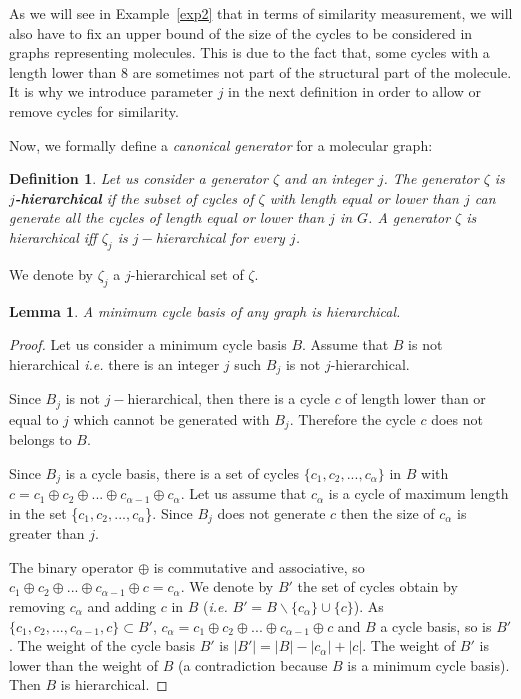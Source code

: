 \documentclass[10pt,letterpaper]{article}
\newtheorem{definition}{Definition}
\newtheorem{lemme}{Lemma}
\begin{document}
As we will see in Example~\ref{exp2} that in terms of similarity measurement, we will also have to fix an upper bound of the size of the cycles to be considered in graphs representing molecules. This is due to the fact that, some cycles with a length lower than $8$ are sometimes not part of the structural part of the molecule. It is why we introduce parameter $j$ in the next definition in order to allow or remove cycles for similarity.

Now, we formally define a \textit{canonical generator} for a molecular graph: 

\begin{definition}
Let us consider a generator $\zeta$ and an integer $j$. The generator $\zeta$ is {\bf $j$-hierarchical} if the subset of cycles of $\zeta$ with length equal or lower than $j$ can generate all the cycles of length equal or lower than $j$ in $G$. A generator $\zeta$ is hierarchical iff $\zeta_j$ is $j-$hierarchical for every $j$. 
\end{definition}


We denote by $\zeta_j$ a $j$-hierarchical set of $\zeta$.

\begin{lemme}
A minimum cycle basis of any graph is hierarchical.
\end{lemme}

\begin{proof}
\normalfont
Let us consider a minimum cycle basis $B$. Assume that $B$ is not hierarchical \textit{i.e.} there is an integer $j$ such $B_j$ is not $j$-hierarchical. 

Since $B_j$ is not $j-$hierarchical, then there is a cycle $c$ of length lower than or equal to $j$ which cannot be generated with $B_j$. Therefore the cycle $c$ does not belongs to $B$. 

Since $B_j$ is a cycle basis, there is a set of cycles $\{c_1, c_2, ..., c_{\alpha}\}$ in $B$ with $ c = c_1 \oplus c_2 \oplus ... \oplus c_{\alpha -1 } \oplus c_{\alpha}$. Let us assume that $c_{\alpha}$ is a cycle of maximum length in the set \{$c_1, c_2, ..., c_{\alpha}$\}. Since $B_j$ does not generate $c$ then the size of $c_{\alpha}$ is greater than $j$.

The binary operator $\oplus$ is commutative and associative, so $c_1 \oplus c_2 \oplus ... \oplus c_{\alpha -1 }\oplus c = c_{\alpha}$.
We denote by $B'$ the set of cycles obtain by removing $c_{\alpha}$ and adding $c$ in $B$ (\textit{i.e.} $B' = B \backslash \{c_{\alpha}\}\cup \{c\} $). As $\{c_1, c_2, ..., c_{\alpha-1},c\} \subset B'$, $ c_{\alpha} = c_1 \oplus c_2 \oplus ... \oplus c_{\alpha -1 } \oplus c $ and $B$ a cycle basis, so is $B'$. The weight of the cycle basis $B'$ is $|B'| = |B| -|c_{\alpha}|+ | c| $. The weight of $B'$ is lower than the weight of $B$ (a contradiction because $B$ is a minimum cycle basis). Then $B$ is hierarchical.
\end{proof}
\end{document}
